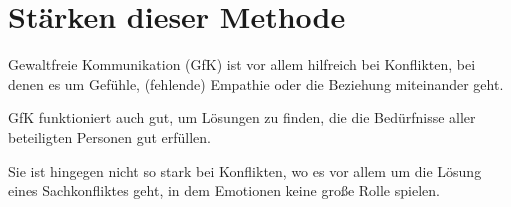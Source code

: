 \section{Stärken dieser Methode}

Gewaltfreie Kommunikation (GfK) ist vor allem hilfreich bei Konflikten, bei denen es um Gefühle, (fehlende) Empathie oder die Beziehung miteinander geht.

GfK funktioniert auch gut, um Lösungen zu finden, die die Bedürfnisse aller beteiligten Personen gut erfüllen.

Sie ist hingegen nicht so stark bei Konflikten, wo es vor allem um die Lösung eines Sachkonfliktes geht, in dem Emotionen keine große Rolle spielen.
